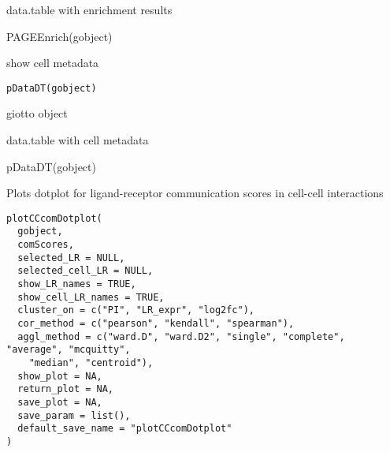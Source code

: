 \documentclass[a4paper]{book}
\begin{document}
%
\begin{Value}
data.table with enrichment results
\end{Value}
%
\begin{SeeAlso}\relax
{}
\end{SeeAlso}
%
\begin{Examples}
\begin{ExampleCode}
    PAGEEnrich(gobject)
\end{ExampleCode}
\end{Examples}
%
\begin{Description}\relax
show cell metadata
\end{Description}
%
\begin{Usage}
\begin{verbatim}
pDataDT(gobject)
\end{verbatim}
\end{Usage}
%
\begin{Arguments}
\begin{ldescription}
\item[\code{gobject}] giotto object
\end{ldescription}
\end{Arguments}
%
\begin{Value}
data.table with cell metadata
\end{Value}
%
\begin{Examples}
\begin{ExampleCode}
    pDataDT(gobject)
\end{ExampleCode}
\end{Examples}
%
\begin{Description}\relax
Plots dotplot for ligand-receptor communication scores in cell-cell interactions
\end{Description}
%
\begin{Usage}
\begin{verbatim}
plotCCcomDotplot(
  gobject,
  comScores,
  selected_LR = NULL,
  selected_cell_LR = NULL,
  show_LR_names = TRUE,
  show_cell_LR_names = TRUE,
  cluster_on = c("PI", "LR_expr", "log2fc"),
  cor_method = c("pearson", "kendall", "spearman"),
  aggl_method = c("ward.D", "ward.D2", "single", "complete", "average", "mcquitty",
    "median", "centroid"),
  show_plot = NA,
  return_plot = NA,
  save_plot = NA,
  save_param = list(),
  default_save_name = "plotCCcomDotplot"
)
\end{verbatim}
\end{Usage}
\end{document}
